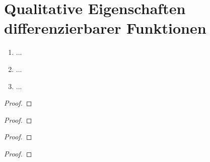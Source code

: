 \documentclass[12pt]{scrreprt}
\begin{document}
\begin{dfn}\label{}

\end{dfn}
\begin{bem*}

\end{bem*}

\section{Qualitative Eigenschaften differenzierbarer Funktionen}
\label{}

\begin{dfn}\label{}

\end{dfn}

\begin{satz}\label{}
\begin{enumerate}
\item ...
\item ...
\item ...
\end{enumerate}
\end{satz}
\begin{proof}

\end{proof}
\begin{bem*}

\end{bem*}
\begin{bsp*}

\end{bsp*}
\begin{proof}

\end{proof}

\begin{thm}\label{}

\end{thm}
\begin{proof}

\end{proof}

\begin{satz}\label{}

\end{satz}
\begin{proof}

\end{proof}

\begin{dfn}\label{}

\end{dfn}
\end{document}
